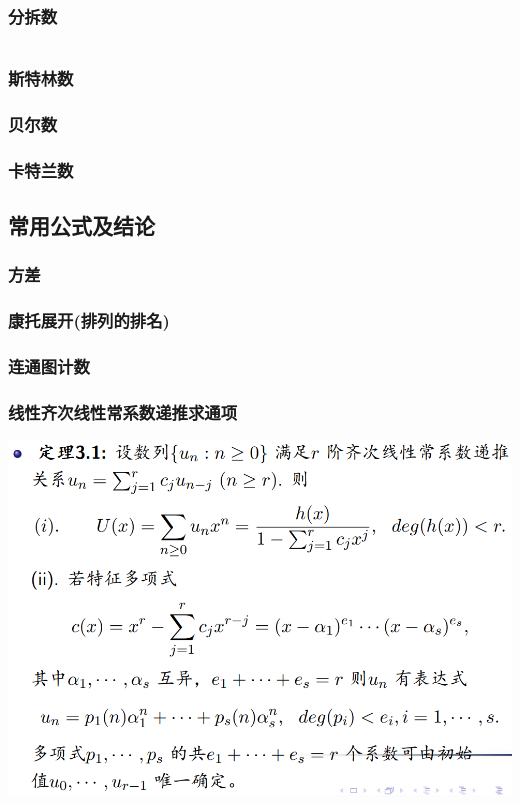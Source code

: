 \documentclass[a4paper, twoside]{article}
\begin{document}
\begin{multicols}{2}
				\subsubsection{分拆数}
					\inputminted{cpp}{../src/math/分拆数.cpp}
				
				\subsubsection{斯特林数}
					
				
				\subsubsection{贝尔数}
					
				
				\subsubsection{卡特兰数}
					
			
			\subsection{常用公式及结论}
				\subsubsection{方差}
					
				
				\subsubsection{康托展开(排列的排名)}
					
				
				\subsubsection{连通图计数}
					

				\subsubsection{线性齐次线性常系数递推求通项}
					\includegraphics[scale = 0.265]{../src/math/线性齐次线性常系数递推.png}
			

\end{multicols}
\end{document}
